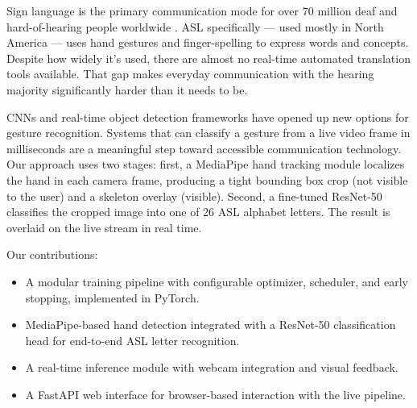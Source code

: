 Sign language is the primary communication mode for over 70 million deaf and 
hard-of-hearing people worldwide \cite{who2021}. ASL specifically — used mostly 
in North America — uses hand gestures and finger-spelling to express words and 
concepts. Despite how widely it's used, there are almost no real-time automated 
translation tools available. That gap makes everyday communication with the 
hearing majority significantly harder than it needs to be.

CNNs and real-time object detection frameworks have opened up new options for 
gesture recognition. Systems that can classify a gesture from a live video frame 
in milliseconds are a meaningful step toward accessible communication technology. 
Our approach uses two stages: first, a MediaPipe hand tracking module localizes 
the hand in each camera frame, producing a tight bounding box crop (not visible 
to the user) and a skeleton overlay (visible). Second, a fine-tuned ResNet-50 
\cite{he2016} classifies the cropped image into one of 26 ASL alphabet letters. 
The result is overlaid on the live stream in real time.

Our contributions:
\begin{itemize}
    \item A modular training pipeline with configurable optimizer, scheduler, and early stopping, implemented in PyTorch.
    \item MediaPipe-based hand detection integrated with a ResNet-50 classification head for end-to-end ASL letter recognition.
    \item A real-time inference module with webcam integration and visual feedback.
    \item A FastAPI web interface for browser-based interaction with the live pipeline.
\end{itemize}